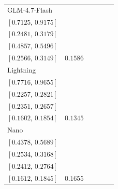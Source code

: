\begin{tabular*}{\linewidth}{@{\extracolsep{\fill}}lccccc@{}}
GLM-4.7-Flash & \begin{tabular}[t]{@{}c@{}}\(0.8147\)\\\([0.7125,\,0.9175]\)\end{tabular} & \begin{tabular}[t]{@{}c@{}}\(0.2839\)\\\([0.2481,\,0.3179]\)\end{tabular} & \begin{tabular}[t]{@{}c@{}}\(0.5177\)\\\([0.4857,\,0.5496]\)\end{tabular} & \begin{tabular}[t]{@{}c@{}}\(0.2856\)\\\([0.2566,\,0.3149]\)\end{tabular} & \(0.1586\)\\[2pt]
Lightning & \begin{tabular}[t]{@{}c@{}}\(0.8680\)\\\([0.7716,\,0.9655]\)\end{tabular} & \begin{tabular}[t]{@{}c@{}}\(0.2541\)\\\([0.2257,\,0.2821]\)\end{tabular} & \begin{tabular}[t]{@{}c@{}}\(0.2503\)\\\([0.2351,\,0.2657]\)\end{tabular} & \begin{tabular}[t]{@{}c@{}}\(0.1726\)\\\([0.1602,\,0.1854]\)\end{tabular} & \(0.1345\)\\[2pt]
Nano & \begin{tabular}[t]{@{}c@{}}\(0.5024\)\\\([0.4378,\,0.5689]\)\end{tabular} & \begin{tabular}[t]{@{}c@{}}\(0.2856\)\\\([0.2534,\,0.3168]\)\end{tabular} & \begin{tabular}[t]{@{}c@{}}\(0.2586\)\\\([0.2412,\,0.2764]\)\end{tabular} & \begin{tabular}[t]{@{}c@{}}\(0.1726\)\\\([0.1612,\,0.1845]\)\end{tabular} & \(0.1655\)\\[2pt]

\end{tabular*}
